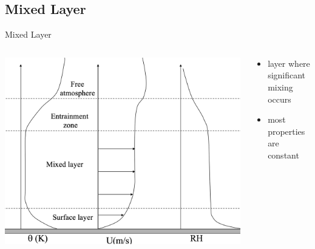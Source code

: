 \subsection{Mixed Layer}
\begin{frame}{Mixed Layer}
\begin{columns}[T]
    \begin{column}{.5\textwidth}
    \begin{minipage}[c][0.7\textheight][c]{\linewidth}
    \includegraphics[width=1\textwidth]{fig12}\\
    \end{minipage}
    \end{column}
    \begin{column}{.6\textwidth}
    \begin{minipage}[c][0.6\textheight][c]{\linewidth}
   \begin{itemize}
   	\item layer where significant mixing occurs
   	\item most properties are constant
   	\end{itemize}
      \end{minipage}
    \end{column}
  \end{columns}
\end{frame}
